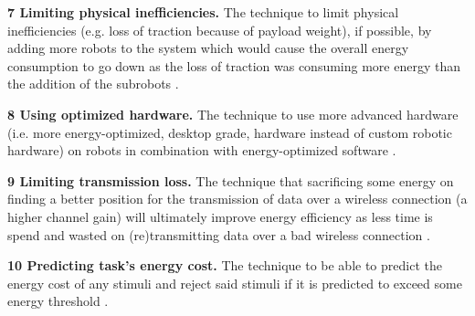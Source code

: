 \vspace{2mm}

\textbf{7 Limiting physical inefficiencies.} The technique to limit physical inefficiencies (e.g. loss of traction because of payload weight), if possible, by adding more robots to the system which would cause the overall
energy consumption to go down as the loss of traction was consuming more energy than the addition of the subrobots \cite{kim2016firefighting_robot}.
    
\vspace{2mm}

\textbf{8 Using optimized hardware.} The technique to use more advanced hardware (i.e. more energy-optimized, desktop grade, hardware instead of custom robotic hardware) 
on robots in combination with energy-optimized software \cite{cheng2018FPGA_image_recognition}.
    
\vspace{2mm}

\textbf{9 Limiting transmission loss.} The technique that sacrificing some energy on finding a better position for the transmission of data over a wireless connection
(a higher channel gain) will ultimately improve energy efficiency as less time is spend and wasted on (re)transmitting 
data over a bad wireless connection \cite{licea2013wireless_comms}.

\vspace{2mm}

\textbf{10 Predicting task's energy cost.} The technique to be able to predict the energy cost of any stimuli and reject said stimuli if it is predicted to exceed some energy threshold 
\cite{kirtay2013humanoid_emotion}.

